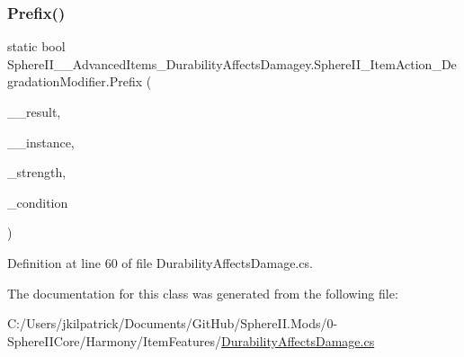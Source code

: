 \subsubsection{\texorpdfstring{Prefix()}{Prefix()}}
{\footnotesize\ttfamily static bool Sphere\+I\+I\+\_\+\+\_\+\+Advanced\+Items\+\_\+\+Durability\+Affects\+Damagey.\+Sphere\+I\+I\+\_\+\+Item\+Action\+\_\+\+Degradation\+Modifier.\+Prefix (\begin{DoxyParamCaption}\item[{float}]{\+\_\+\+\_\+result,  }\item[{Item\+Action\+Attack}]{\+\_\+\+\_\+instance,  }\item[{float}]{\+\_\+strength,  }\item[{float}]{\+\_\+condition }\end{DoxyParamCaption})\hspace{0.3cm}{\ttfamily [static]}}



Definition at line 60 of file Durability\+Affects\+Damage.\+cs.



The documentation for this class was generated from the following file\+:\begin{DoxyCompactItemize}
\item 
C\+:/\+Users/jkilpatrick/\+Documents/\+Git\+Hub/\+Sphere\+I\+I.\+Mods/0-\/\+Sphere\+I\+I\+Core/\+Harmony/\+Item\+Features/\mbox{\hyperlink{_durability_affects_damage_8cs}{Durability\+Affects\+Damage.\+cs}}\end{DoxyCompactItemize}
